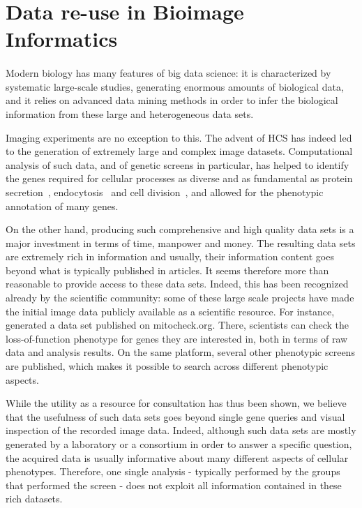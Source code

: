 \section{Data re-use in Bioimage Informatics}
\paragraph*{}

Modern biology has many features of big data science: it is
characterized by systematic large-scale studies, generating enormous
amounts of biological data, and it relies on advanced data mining
methods in order to infer the biological information from these large
and heterogeneous data sets. 

Imaging experiments are no exception to this. The advent of HCS has indeed led to the generation of extremely large and complex image datasets. Computational analysis of such data, and of genetic screens in particular, has helped to identify the genes required for cellular processes as diverse and as fundamental as protein secretion~\cite{simpson2012genome}, endocytosis~\cite{collinet2010systems} and cell division~\cite{pmid20360735}, and allowed for the phenotypic annotation of many
genes.  

On the other hand, producing such comprehensive and high quality data
sets is a major investment in terms of time, manpower and money. The
resulting data sets are extremely rich in information and usually,
their information content goes beyond what is typically published in
articles. It seems therefore more than reasonable to provide access to
these data sets. Indeed, this has been recognized already by the
scientific community: some of these large scale
projects have made the initial image data publicly available as a
scientific resource. For instance, ~\cite{pmid20360735} generated a
data set published on mitocheck.org. There, scientists can check the
loss-of-function phenotype for genes they are interested in, both in
terms of raw data and analysis results. On the same
platform, several other phenotypic screens are published, which makes it possible to search across different phenotypic aspects. 


While the utility as a resource for consultation has thus been shown, we
believe that the usefulness of such data sets goes beyond single gene
queries and visual inspection of the recorded image data. Indeed, although such data sets are mostly generated  by a laboratory or a consortium in order to answer a specific question, the acquired
data is usually informative about many different aspects of cellular
phenotypes. Therefore, one single analysis - typically performed by
the groups that performed the screen - does not exploit all information
contained in these rich datasets. 

